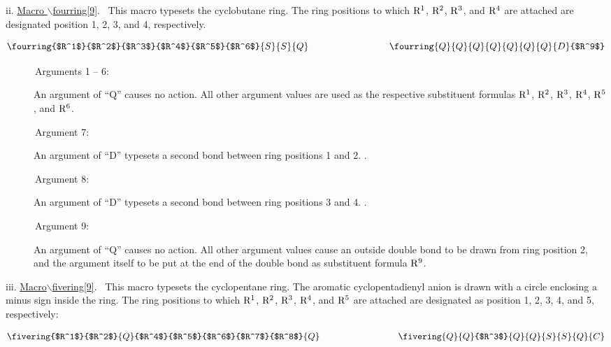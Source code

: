  \vspace{\len mm}
 \indent ii. \underline{Macro $\backslash $fourring[9]}.
 \ This macro typesets the cyclobutane ring. The ring positions
 to which ${\rm R^1}$, ${\rm R^2}$, ${\rm R^3}$, and ${\rm R^4}$
 are attached are designated position 1, 2, 3, and 4, respectively.
 
 \[ \fourring{$R^1$}{$R^2$}{$R^3$}{$R^4$}{$R^5$}{$R^6$}{S}{S}{Q} 
    \hspace{3cm}
    \fourring{Q}{Q}{Q}{Q}{Q}{Q}{Q}{D}{$R^9$} \]
 
 \begin{description}
 \item[{\rm \ \ \ \ \ \ Arguments 1 -- 6:}] An argument of ``Q'' causes
      no action. All other argument values are used as the respective
      substituent formulas ${\rm R^1}$, ${\rm R^2}$, ${\rm R^3}$,
      ${\rm R^4}$, ${\rm R^5}$, and ${\rm R^6}$.
 \item[{\rm \ \ \ \ \ \ Argument 7:}] An argument of ``D'' typesets
      a second bond between ring positions 1 and 2. \ri .
 \item[{\rm \ \ \ \ \ \ Argument 8:}] An argument of ``D'' typesets
      a second bond between ring positions 3 and 4. \ri .
 \item[{\rm \ \ \ \ \ \ Argument 9:}] An argument of ``Q'' causes
      no action. All other argument values cause an outside
      double bond to be drawn from ring position 2, and the
      argument itself to be put at the end of the double bond
      as substituent formula ${\rm R^9}$.
 \end{description}

 \vspace{\len mm}
 \indent iii. \underline{Macro$\backslash $fivering[9]}.
 \ This macro typesets the cyclopentane ring. The aromatic
 cyclopentadienyl anion is drawn with a circle enclosing a
 minus sign inside the ring. The ring positions to which 
 ${\rm R^1}$, ${\rm R^2}$, ${\rm R^3}$, ${\rm R^4}$, and
 ${\rm R^5}$ are attached are designated as position
 1, 2, 3, 4, and 5, respectively:

 \[ \fivering{$R^1$}{$R^2$}{Q}{$R^4$}{$R^5$}{$R^6$}{$R^7$}{$R^8$}{Q}
    \hspace{3cm}
    \fivering{Q}{Q}{$R^3$}{Q}{Q}{S}{S}{Q}{C}  \]

